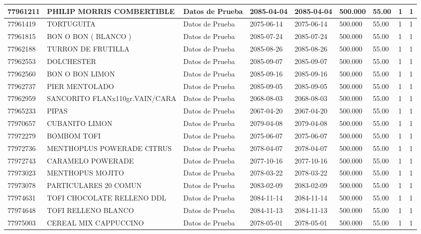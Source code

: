 \documentclass[a4paper,12pt]{article}
\begin{document}
\begin{landscape}
\begin{longtable}{|p{4cm}|p{2.5cm}|p{2.5cm}|p{1.8cm}|p{1.8cm}|p{1cm}|p{1cm}|p{3cm}|p{3cm}||}
77961211 & PHILIP  MORRIS  COMBERTIBLE & Datos de Prueba & 2085-04-04 & 2085-04-04 & 500.000 & 55.00 & 1 & 1 \\ \hline 
77961419 & TORTUGUITA & Datos de Prueba & 2075-06-14 & 2075-06-14 & 500.000 & 55.00 & 1 & 1 \\ \hline 
77961815 & BON O  BON  ( BLANCO ) & Datos de Prueba & 2085-07-24 & 2085-07-24 & 500.000 & 55.00 & 1 & 1 \\ \hline 
77962188 & TURRON  DE FRUTILLA & Datos de Prueba & 2085-08-26 & 2085-08-26 & 500.000 & 55.00 & 1 & 1 \\ \hline 
77962553 & DOLCHESTER & Datos de Prueba & 2085-09-07 & 2085-09-07 & 500.000 & 55.00 & 1 & 1 \\ \hline 
77962560 & BON O BON LIMON & Datos de Prueba & 2085-09-16 & 2085-09-16 & 500.000 & 55.00 & 1 & 1 \\ \hline 
77962737 & PIER  MENTOLADO & Datos de Prueba & 2085-09-05 & 2085-09-05 & 500.000 & 55.00 & 1 & 1 \\ \hline 
77962959 & SANCORITO FLANx110gr.VAIN/CARA & Datos de Prueba & 2068-08-03 & 2068-08-03 & 500.000 & 55.00 & 1 & 1 \\ \hline 
77965233 & PIPAS & Datos de Prueba & 2067-04-20 & 2067-04-20 & 500.000 & 55.00 & 1 & 1 \\ \hline 
77970657 & CUBANITO LIMON & Datos de Prueba & 2079-04-08 & 2079-04-08 & 500.000 & 55.00 & 1 & 1 \\ \hline 
77972279 & BOMBOM TOFI & Datos de Prueba & 2075-06-07 & 2075-06-07 & 500.000 & 55.00 & 1 & 1 \\ \hline 
77972736 & MENTHOPLUS POWERADE CITRUS & Datos de Prueba & 2078-04-07 & 2078-04-07 & 500.000 & 55.00 & 1 & 1 \\ \hline 
77972743 & CARAMELO POWERADE & Datos de Prueba & 2077-10-16 & 2077-10-16 & 500.000 & 55.00 & 1 & 1 \\ \hline 
77973023 & MENTHOPUS MOJITO & Datos de Prueba & 2078-03-22 & 2078-03-22 & 500.000 & 55.00 & 1 & 1 \\ \hline 
77973078 & PARTICULARES 20 COMUN & Datos de Prueba & 2083-02-09 & 2083-02-09 & 500.000 & 55.00 & 1 & 1 \\ \hline 
77974631 & TOFI CHOCOLATE RELLENO DDL & Datos de Prueba & 2084-11-14 & 2084-11-14 & 500.000 & 55.00 & 1 & 1 \\ \hline 
77974648 & TOFI RELLENO BLANCO & Datos de Prueba & 2084-11-13 & 2084-11-13 & 500.000 & 55.00 & 1 & 1 \\ \hline 
77975003 & CEREAL MIX CAPPUCCINO & Datos de Prueba & 2078-05-01 & 2078-05-01 & 500.000 & 55.00 & 1 & 1 \\ \hline 

\end{longtable}
\end{landscape}
\end{document}
